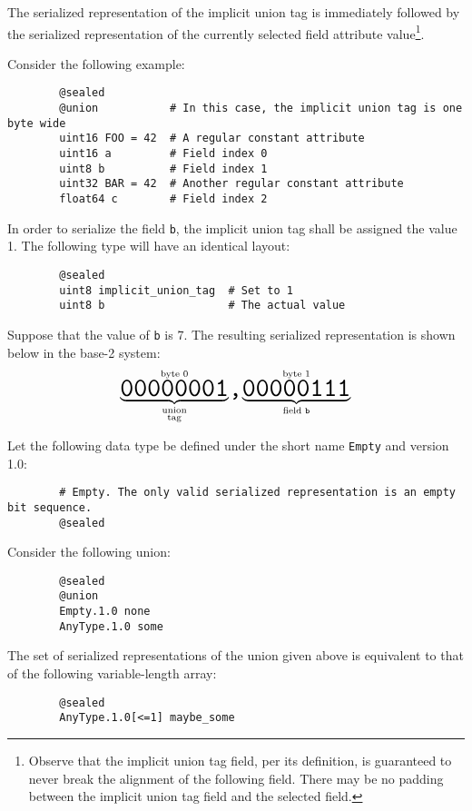 The serialized representation of the implicit union tag is immediately followed by
the serialized representation of the currently selected field attribute value\footnote{%
    Observe that the implicit union tag field, per its definition,
    is guaranteed to never break the alignment of the following field.
    There may be no padding between the implicit union tag field and the selected field.
}.

\begin{remark}
    Consider the following example:

    \begin{verbatim}
        @sealed
        @union           # In this case, the implicit union tag is one byte wide
        uint16 FOO = 42  # A regular constant attribute
        uint16 a         # Field index 0
        uint8 b          # Field index 1
        uint32 BAR = 42  # Another regular constant attribute
        float64 c        # Field index 2
    \end{verbatim}

    In order to serialize the field \verb|b|, the implicit union tag shall be assigned the value 1.
    The following type will have an identical layout:

    \begin{verbatim}
        @sealed
        uint8 implicit_union_tag  # Set to 1
        uint8 b                   # The actual value
    \end{verbatim}

    Suppose that the value of \verb|b| is 7.
    The resulting serialized representation is shown below in the base-2 system:
    $$%
    \overset{\text{byte 0}}{%
        \underbrace{\hugett{00000001}}_{\substack{\text{union} \\ \text{tag}}}%
    }%
    \hugett{,}%
    \overset{\text{byte 1}}{%
        \underbrace{\hugett{00000111}}_{\text{field }\texttt{b}}%
    }
    $$

\end{remark}

\begin{remark}
    Let the following data type be defined under the short name \verb|Empty| and version 1.0:

    \begin{verbatim}
        # Empty. The only valid serialized representation is an empty bit sequence.
        @sealed
    \end{verbatim}

    Consider the following union:

    \begin{verbatim}
        @sealed
        @union
        Empty.1.0 none
        AnyType.1.0 some
    \end{verbatim}

    The set of serialized representations of the union given above is equivalent to
    that of the following variable-length array:

    \begin{verbatim}
        @sealed
        AnyType.1.0[<=1] maybe_some
    \end{verbatim}
\end{remark}

